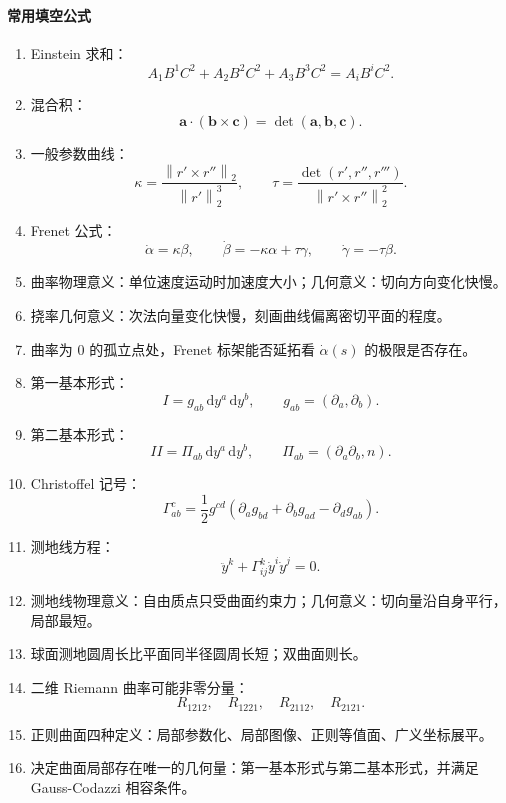 \documentclass[UTF8,12pt,a4paper]{ctexart}
\newcommand{\dd}{\,\mathrm d}
\newcommand{\vct}[1]{\boldsymbol{#1}}
\newcommand{\norm}[1]{\left\lVert #1\right\rVert}
\begin{document}
\paragraph{常用填空公式}
\begin{enumerate}
\item Einstein 求和：
\[
A_1B^1C^2+A_2B^2C^2+A_3B^3C^2=A_iB^iC^2.
\]
\item 混合积：
\[
\vct a\cdot(\vct b\times\vct c)=\det(\vct a,\vct b,\vct c).
\]
\item 一般参数曲线：
\[
\kappa=\frac{\norm{r'\times r''}_2}{\norm{r'}_2^3},\qquad
\tau=\frac{\det(r',r'',r''')}{\norm{r'\times r''}_2^2}.
\]
\item Frenet 公式：
\[
\dot\alpha=\kappa\beta,\qquad
\dot\beta=-\kappa\alpha+\tau\gamma,\qquad
\dot\gamma=-\tau\beta.
\]
\item 曲率物理意义：单位速度运动时加速度大小；几何意义：切向方向变化快慢。
\item 挠率几何意义：次法向量变化快慢，刻画曲线偏离密切平面的程度。
\item 曲率为 $0$ 的孤立点处，Frenet 标架能否延拓看 $\dot\alpha(s)$ 的极限是否存在。
\item 第一基本形式：
\[
I=g_{ab}\dd y^a\dd y^b,\qquad g_{ab}=(\partial_a,\partial_b).
\]
\item 第二基本形式：
\[
II=\Pi_{ab}\dd y^a\dd y^b,\qquad \Pi_{ab}=(\partial_a\partial_b,n).
\]
\item Christoffel 记号：
\[
\Gamma^c_{ab}=\frac12g^{cd}(\partial_ag_{bd}+\partial_bg_{ad}-\partial_dg_{ab}).
\]
\item 测地线方程：
\[
\ddot y^k+\Gamma^k_{ij}\dot y^i\dot y^j=0.
\]
\item 测地线物理意义：自由质点只受曲面约束力；几何意义：切向量沿自身平行，局部最短。
\item 球面测地圆周长比平面同半径圆周长短；双曲面则长。
\item 二维 Riemann 曲率可能非零分量：
\[
R_{1212},\quad R_{1221},\quad R_{2112},\quad R_{2121}.
\]
\item 正则曲面四种定义：局部参数化、局部图像、正则等值面、广义坐标展平。
\item 决定曲面局部存在唯一的几何量：第一基本形式与第二基本形式，并满足 Gauss-Codazzi 相容条件。
\end{enumerate}
\end{document}
